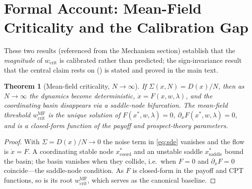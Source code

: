 \documentclass[letterpaper]{article}
\theoremstyle{plain}
\newtheorem{theorem}{Theorem}
\newcommand{\wcrit}{w_{\mathrm{crit}}}
\begin{document}

\section{Formal Account: Mean-Field Criticality and the Calibration Gap}
\label{sec:appendix_theorems}
These two results (referenced from the Mechanism section) establish that the
\emph{magnitude} of $\wcrit$ is calibrated rather than predicted; the
sign-invariance result that the central claim rests on () is
stated and proved in the main text.

\begin{theorem}[Mean-field criticality, $N\to\infty$]\label{thm:mf}
If $\Sigma(x,N)=D(x)/N$, then as $N\to\infty$ the dynamics become deterministic,
$\dot x=F(x,w,\lambda)$, and the coordinating basin disappears via a saddle-node
bifurcation. The mean-field threshold $w_{\mathrm{crit}}^{\mathrm{MF}}$ is the
unique solution of $F(x^\ast,w,\lambda)=0$, $\partial_x F(x^\ast,w,\lambda)=0$,
and is a closed-form function of the payoff and prospect-theory parameters.
\end{theorem}
\begin{proof}
With $\Sigma=D(x)/N\to0$ the noise term in \eqref{eq:sde} vanishes and the flow
is $\dot x=F$. A coordinating stable node $x^\ast_{\mathrm{coord}}$ and an
unstable saddle $x^\ast_{\mathrm{saddle}}$ bound the basin; the basin vanishes
when they collide, i.e.\ when $F=0$ and $\partial_x F=0$ coincide---the
saddle-node condition. As $F$ is closed-form in the payoff and CPT functions, so
is its root $w_{\mathrm{crit}}^{\mathrm{MF}}$, which serves as the canonical
baseline.
\end{proof}
\end{document}
